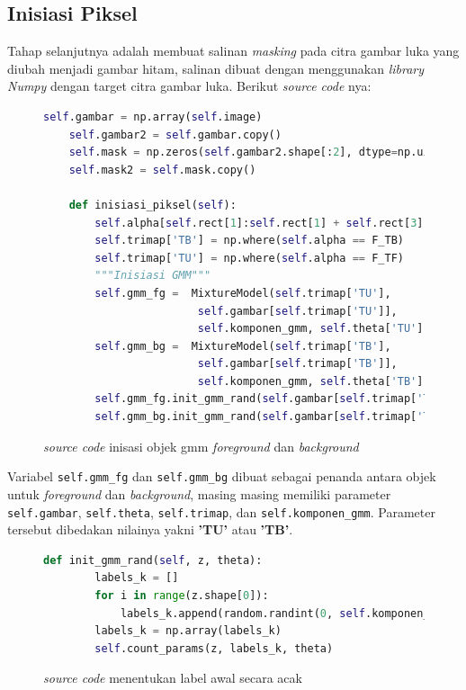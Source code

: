 \subsection{Inisiasi Piksel}
Tahap selanjutnya adalah membuat salinan \emph{masking} pada citra gambar luka yang diubah
menjadi gambar hitam, salinan dibuat dengan menggunakan \emph{library} \emph{Numpy}
dengan target citra gambar luka. Berikut \emph{source code} nya:

\begin{figure}[H]
	\begin{lstlisting}[language=Python, basicstyle=\tiny]
	self.gambar = np.array(self.image)
	self.gambar2 = self.gambar.copy()
	self.mask = np.zeros(self.gambar2.shape[:2], dtype=np.uint8)
	self.mask2 = self.mask.copy()

	def inisiasi_piksel(self):
		self.alpha[self.rect[1]:self.rect[1] + self.rect[3],self.rect[0]:self.rect[0] + self.rect[2]] = F_TF
		self.trimap['TB'] = np.where(self.alpha == F_TB)
		self.trimap['TU'] = np.where(self.alpha == F_TF)
		"""Inisiasi GMM"""
		self.gmm_fg =  MixtureModel(self.trimap['TU'], 
						self.gambar[self.trimap['TU']], 
						self.komponen_gmm, self.theta['TU'])
		self.gmm_bg =  MixtureModel(self.trimap['TB'], 
						self.gambar[self.trimap['TB']], 
						self.komponen_gmm, self.theta['TB'])
		self.gmm_fg.init_gmm_rand(self.gambar[self.trimap['TU']], self.theta['TU'])
		self.gmm_bg.init_gmm_rand(self.gambar[self.trimap['TB']], self.theta['TB'])
	\end{lstlisting}
	\caption{\emph{source code} inisasi objek gmm \emph{foreground} dan \emph{background} }
	\label{code:mask_image}
\end{figure}

Variabel  \texttt{self.gmm\_fg} dan \texttt{self.gmm\_bg} dibuat sebagai penanda antara objek untuk
\emph{foreground} dan \emph{background}, masing masing memiliki parameter \texttt{self.gambar}, 
\texttt{self.theta}, \texttt{self.trimap}, dan \texttt{self.komponen\_gmm}. Parameter 
tersebut dibedakan nilainya yakni \textbf{'TU'} atau \textbf{'TB'}. 

\begin{figure}[H]
	\begin{lstlisting}[language=Python, basicstyle=\tiny]
	def init_gmm_rand(self, z, theta):
        labels_k = []
        for i in range(z.shape[0]):
            labels_k.append(random.randint(0, self.komponen_gmm-1))
        labels_k = np.array(labels_k)
        self.count_params(z, labels_k, theta)
	\end{lstlisting}
	\caption{\emph{source code} menentukan label awal secara acak}
	\label{code:init_gmm_random}
\end{figure}

